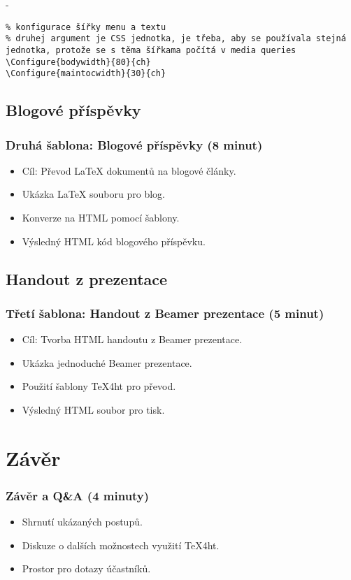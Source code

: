 \documentclass{beamer}
\begin{document}
- 

\begin{verbatim}
% konfigurace šířky menu a textu
% druhej argument je CSS jednotka, je třeba, aby se používala stejná jednotka, protože se s těma šířkama počítá v media queries
\Configure{bodywidth}{80}{ch}
\Configure{maintocwidth}{30}{ch}
\end{verbatim}


\subsection{Blogové příspěvky}
\begin{frame}
\frametitle{Druhá šablona: Blogové příspěvky (8 minut)}
\begin{itemize}
    \item Cíl: Převod LaTeX dokumentů na blogové články.
    \item Ukázka LaTeX souboru pro blog.
    \item Konverze na HTML pomocí šablony.
    \item Výsledný HTML kód blogového příspěvku.
\end{itemize}
\end{frame}

\subsection{Handout z prezentace}
\begin{frame}
\frametitle{Třetí šablona: Handout z Beamer prezentace (5 minut)}
\begin{itemize}
    \item Cíl: Tvorba HTML handoutu z Beamer prezentace.
    \item Ukázka jednoduché Beamer prezentace.
    \item Použití šablony TeX4ht pro převod.
    \item Výsledný HTML soubor pro tisk.
\end{itemize}
\end{frame}

\section{Závěr}

\begin{frame}
\frametitle{Závěr a Q\&A (4 minuty)}
\begin{itemize}
    \item Shrnutí ukázaných postupů.
    \item Diskuze o dalších možnostech využití TeX4ht.
    \item Prostor pro dotazy účastníků.
\end{itemize}
\end{frame}
\end{document}
